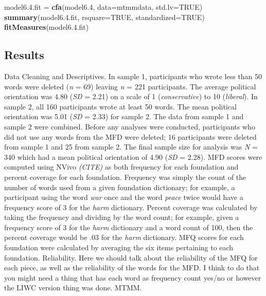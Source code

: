 \documentclass[english,man]{apa6}
\newenvironment{Shaded}{\begin{snugshade}}{\end{snugshade}}
\newcommand{\KeywordTok}[1]{\textcolor[rgb]{0.13,0.29,0.53}{\textbf{#1}}}
\newcommand{\DataTypeTok}[1]{\textcolor[rgb]{0.13,0.29,0.53}{#1}}
\newcommand{\DecValTok}[1]{\textcolor[rgb]{0.00,0.00,0.81}{#1}}
\newcommand{\FloatTok}[1]{\textcolor[rgb]{0.00,0.00,0.81}{#1}}
\newcommand{\StringTok}[1]{\textcolor[rgb]{0.31,0.60,0.02}{#1}}
\newcommand{\OtherTok}[1]{\textcolor[rgb]{0.56,0.35,0.01}{#1}}
\newcommand{\NormalTok}[1]{#1}
\theoremstyle{definition}
\theoremstyle{definition}
\theoremstyle{definition}
\theoremstyle{remark}
\begin{document}
\begin{Shaded}
\begin{Highlighting}[]
\NormalTok{model6.}\FloatTok{4.}\NormalTok{fit =}\StringTok{ }\KeywordTok{cfa}\NormalTok{(model6.}\DecValTok{4}\NormalTok{, }\DataTypeTok{data=}\NormalTok{mtmmdata, }\DataTypeTok{std.lv=}\OtherTok{TRUE}\NormalTok{)}
\KeywordTok{summary}\NormalTok{(model6.}\FloatTok{4.}\NormalTok{fit, }\DataTypeTok{rsquare=}\OtherTok{TRUE}\NormalTok{, }\DataTypeTok{standardized=}\OtherTok{TRUE}\NormalTok{)}
\KeywordTok{fitMeasures}\NormalTok{(model6.}\FloatTok{4.}\NormalTok{fit) }
\end{Highlighting}
\end{Shaded}

\subsection{Results}\label{results-2}

Data Cleaning and Descriptives. In sample 1, participants who wrote less
than 50 words were deleted (\emph{n} = 69) leaving \emph{n} = 221
participants. The average political orientation was 4.80 (\emph{SD} =
2.21) on a scale of 1 (\emph{conservative}) to 10 (\emph{liberal}). In
sample 2, all 160 participants wrote at least 50 words. The mean
political orientation was 5.01 (\emph{SD} = 2.33) for sample 2. The data
from sample 1 and sample 2 were combined. Before any analyses were
conducted, participants who did not use any words from the MFD were
deleted; 16 participants were deleted from sample 1 and 25 from sample
2. The final sample size for analysis was \emph{N} = 340 which had a
mean political orientation of 4.90 (\emph{SD} = 2.28). MFD scores were
computed using NVivo \emph{(CITE)} as both frequency for each foundation
and percent coverage for each foundation. Frequency was simply the count
of the number of words used from a given foundation dictionary; for
example, a participant using the word \emph{war} once and the word
\emph{peace} twice would have a frequency score of 3 for the \emph{harm}
dictionary. Percent coverage was calculated by taking the frequency and
dividing by the word count; for example, given a frequency score of 3
for the \emph{harm} dictionary and a word count of 100, then the percent
coverage would be .03 for the \emph{harm} dictionary. MFQ scores for
each foundation were calculated by averaging the six items pertaining to
each foundation. Reliability. Here we should talk about the reliability
of the MFQ for each piece, as well as the reliability of the words for
the MFD. I think to do that you might need a thing that has each word as
frequency count yes/no or however the LIWC version thing was done. MTMM.
\end{document}
